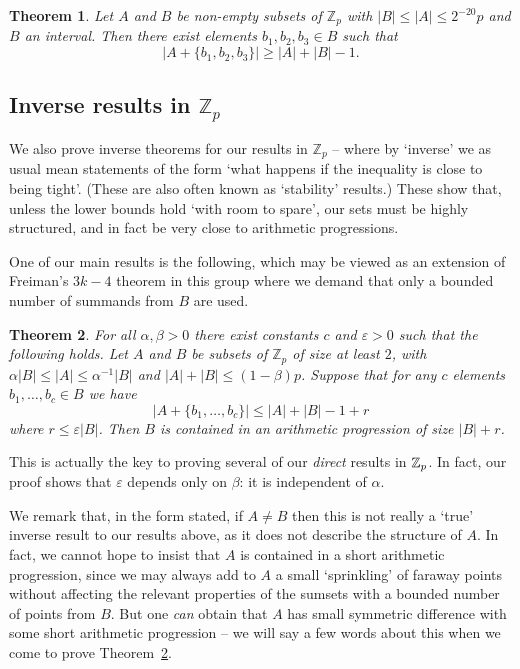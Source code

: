 \documentclass[12pt,reqno]{amsart}
\newtheorem{theorem}{Theorem}
\theoremstyle{definition}
\renewcommand\leq{\leqslant}
\renewcommand\ge{\geqslant}
\begin{document}
\begin{theorem}\label{intro_four_translates_Zp}
Let $A$ and $B$ be non-empty subsets of $\mathbb{Z}_p$ with
$ |B| \leq |A| \leq 2^{-20}p$ and $B$ an interval.
Then there exist elements $b_1,b_2,b_3 \in B$
such that $$|A+\{b_1, b_2,b_3\}| \ge |A|+|B|-1.$$
\end{theorem}


\vspace{10pt}
\subsection{Inverse results in $\mathbb{Z}_p$}
We also prove inverse theorems for our results in ${\mathbb Z}_p$ -- where by `inverse' we as usual
mean statements of the form `what happens if the inequality is close to being tight'. (These are also often
known as `stability' results.) These show that, unless the
lower bounds hold `with room to spare', our sets must be highly structured, and in fact be very close to
arithmetic progressions.

One of our main results is the following, which may be viewed
as an extension of Freiman's $3k-4$ theorem in this group where we demand that only a bounded number of
summands from $B$ are used.

\begin{theorem}\label{stability_in_Zp_for_intro}
  For all $\alpha,\beta>0$ there exist constants $c$ and $\varepsilon>0$ such that the following holds.
  Let $A$ and $B$ be subsets of $\mathbb{Z}_p$ of size at least $2$,
  with $\alpha |B| \leq |A| \leq
  \alpha^{-1}  |B|$ and
  $|A|+|B|\leq (1-\beta)p$. Suppose that for any $c$ elements
  $b_1, \hdots, b_c \in B$ we have
$$|A+\{b_1, \hdots, b_c\}|\leq |A|+|B|-1+r$$
where $r \leq \varepsilon |B|$. Then $B$ is contained in an arithmetic progression of size
$|B|+r$.
\end{theorem}

\vspace{5pt}
This is actually the key to proving several of our {\em direct} results in ${\Bbb Z}_p$. In fact, our proof shows that $\varepsilon$ depends only on $\beta$: it is independent of $\alpha$.

We remark
that, in the form stated, if $A \neq B$ then this is not really a `true' inverse result to our results
above, as it does not describe
the structure of $A$. In fact, we cannot hope to insist that $A$ is contained in a short arithmetic progression, since
we may always add to $A$ a small `sprinkling' of faraway points without affecting the relevant properties of the
sumsets with a bounded number of points from $B$. But one {\it can} obtain that $A$ has small symmetric difference
with some short arithmetic progression -- we will say a few words about this when we come to prove
Theorem~\ref{stability_in_Zp_for_intro}.
\end{document}
